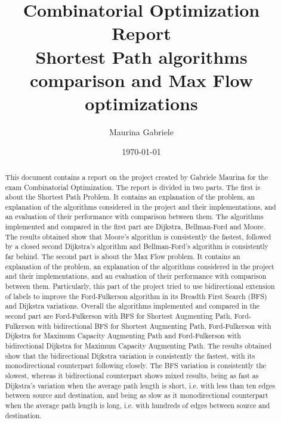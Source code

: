 \documentclass{article}
\title{Combinatorial Optimization Report\\[1ex]
\large Shortest Path algorithms comparison and Max Flow optimizations}
\author{Maurina Gabriele}
\date{\today}
\begin{document}
\begin{titlepage}
\maketitle
\end{titlepage}

\begin{abstract}
This document contains a report on the project created by Gabriele Maurina for the exam Combinatorial Optimization.
The report is divided in two parts. The first is about the Shortest Path Problem. It contains an explanation of the problem,
an explanation of the algorithms considered in the project and their implementations, and an evaluation of their performance
with comparison between them. The algorithms implemented and compared in the first part are Dijkstra, Bellman-Ford and Moore.
The results obtained show that Moore's algorithm is consistently the fastest, followed by a closed second Dijkstra's algorithm
and Bellman-Ford's algorithm is consistently far behind.
The second part is about the Max Flow problem. It contains an explanation of the problem, an explanation of the algorithms considered in the project and
their implementations, and an evaluation of their performance with comparison between them. Particularly, this part of the project tried to
use bidirectional extension of labels to improve the Ford-Fulkerson algorithm in its Breadth First Search (BFS) and Dijkstra variations. Overall the algorithms implemented
and compared in the second part are Ford-Fulkerson with BFS for Shortest Augmenting Path, Ford-Fulkerson with bidirectional BFS for Shortest Augmenting Path,
Ford-Fulkerson with Dijkstra for Maximum Capacity Augmenting Path and Ford-Fulkerson with bidirectional Dijkstra for Maximum Capacity Augmenting Path.
The results obtained show that the bidirectional Dijkstra variation is consistently the fastest, with its monodirectional counterpart following closely.
The BFS variation is consistently the slowest, whereas it bidirectional counterpart shows mixed results, being as fast as Dijkstra's variation
when the average path length is short, i.e. with less than ten edges between source and destination, and being as slow as it monodirectional
counterpart when the average path length is long, i.e. with hundreds of edges between source and destination.
\end{abstract}

\tableofcontents




\end{document}
